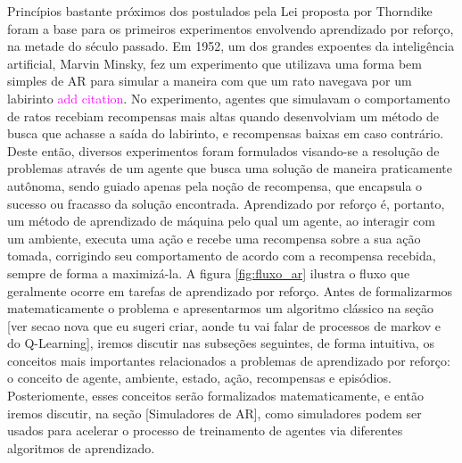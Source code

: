 \documentclass[cic,tc]{iiufrgs}
\newcommand\bruno[1]{\textcolor{magenta}{#1}}
\begin{document}
    Princípios bastante próximos dos postulados pela Lei proposta por Thorndike foram a base para os primeiros experimentos
    envolvendo aprendizado por reforço, na metade do século passado. Em 1952, um dos grandes expoentes da inteligência artificial,
    Marvin Minsky, fez um experimento que utilizava uma forma bem simples de AR para simular a maneira com que um rato
    navegava por um labirinto \bruno{add citation}. No experimento, agentes que simulavam o comportamento de ratos recebiam recompensas mais altas quando desenvolviam um
    método de busca que achasse a saída do labirinto, e recompensas baixas em caso contrário.
    Deste então, diversos experimentos foram formulados visando-se a resolução de problemas através de um agente que busca uma solução
    de maneira praticamente autônoma, sendo guiado apenas pela noção de recompensa, que encapsula o sucesso ou fracasso da solução encontrada.
    Aprendizado por reforço é, portanto, um método de aprendizado de máquina pelo qual um agente, ao interagir com um ambiente,
    executa uma ação e recebe uma recompensa sobre a sua ação tomada, corrigindo seu comportamento de acordo com a recompensa recebida,
    sempre de forma a maximizá-la.
    A figura \ref{fig:fluxo_ar} ilustra o fluxo que geralmente ocorre em tarefas de aprendizado por reforço.
     Antes de formalizarmos matematicamente o
    problema e apresentarmos um algoritmo clássico na seção [ver secao nova que eu sugeri criar, aonde tu vai falar de processos de
    markov e do Q-Learning], iremos discutir nas subseções seguintes, de forma intuitiva, os conceitos mais importantes relacionados a problemas de aprendizado
    por reforço: o conceito de agente, ambiente, estado, ação, recompensas e episódios. Posteriomente, esses conceitos serão formalizados matematicamente, e então
    iremos discutir, na seção [Simuladores de AR], como simuladores podem ser usados para acelerar o processo de treinamento de agentes via
    diferentes algoritmos de aprendizado.
    
\end{document}
